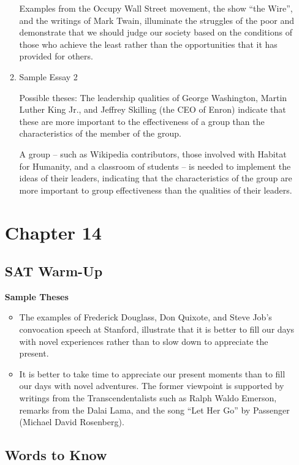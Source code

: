 \begin{enumerate}
\begin{enumerate}
\bigskip
Examples from the Occupy Wall Street movement, the show ``the Wire'', and the writings of Mark Twain, illuminate the struggles of the poor and demonstrate that we should judge our society based on the conditions of those who achieve the least rather than the opportunities that it has provided for others. 

\item Sample Essay 2

Possible theses: The leadership qualities of George Washington, Martin Luther King Jr., and Jeffrey Skilling (the CEO of Enron) indicate that these are more important to the effectiveness of a group than the characteristics of the member of the group. 

\bigskip
A group -- such as Wikipedia contributors, those involved with Habitat for Humanity, and a classroom of students -- is needed to implement the ideas of their leaders, indicating that the characteristics of the group are more important to group effectiveness than the qualities of their leaders. 
\end{enumerate}



\section{Chapter 14}
\subsection{SAT Warm-Up}

\textbf{Sample Theses}
\begin{itemize} 
\item The examples of Frederick Douglass, Don Quixote, and Steve Job's convocation speech at Stanford, illustrate that it is better to fill our days with novel experiences rather than to slow down to appreciate the present. 

\item It is better to take time to appreciate our present moments than to fill our days with novel adventures. The former viewpoint is supported by writings from the Transcendentalists such as Ralph Waldo Emerson, remarks from the Dalai Lama, and the song ``Let Her Go'' by Passenger (Michael David Rosenberg). 

\end{itemize}

\subsection{Words to Know}


\end{enumerate}
